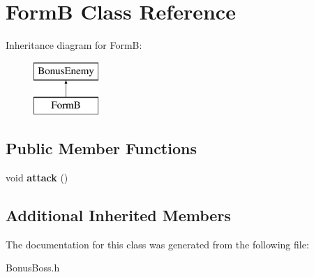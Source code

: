 \hypertarget{class_form_b}{\section{Form\+B Class Reference}
\label{class_form_b}
}
Inheritance diagram for Form\+B\+:\begin{figure}[H]
\begin{center}
\leavevmode
\includegraphics[height=2.000000cm]{class_form_b}
\end{center}
\end{figure}
\subsection*{Public Member Functions}
\begin{DoxyCompactItemize}
\item 
\hypertarget{class_form_b_a3d734a4f14d812c6336b718989350009}{void {\bfseries attack} ()}\label{class_form_b_a3d734a4f14d812c6336b718989350009}

\end{DoxyCompactItemize}
\subsection*{Additional Inherited Members}


The documentation for this class was generated from the following file\+:\begin{DoxyCompactItemize}
\item 
Bonus\+Boss.\+h\end{DoxyCompactItemize}
